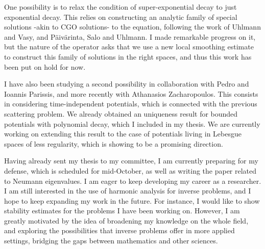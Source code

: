 \documentclass{article}
\begin{document}
One possibility is to relax the condition of super-exponential decay to just exponential decay. This relies on constructing an analytic family of special solutions -akin to CGO solutions- to the equation, following the work of Uhlmann and Vasy, and P\"aiv\"arinta, Salo and Uhlmann. I made remarkable progress on it, but the nature of the operator asks that we use a new local smoothing estimate to construct this family of solutions in the right spaces, and thus this work has been put on hold for now.

I have also been studying a second possibility in collaboration with Pedro and Ioannis Parissis, and more recently with Athanasios Zacharopoulos. This consists in considering time-independent potentials, which is connected with the previous scattering problem. We already obtained an uniqueness result for bounded potentials with polynomial decay, which I included in my thesis. We are currently working on extending this result to the case of potentials living in Lebesgue spaces of less regularity, which is showing to be a promising direction.

Having already sent my thesis to my committee, I am currently preparing for my defense, which is scheduled for mid-October, as well as writing the paper related to Neumann eigenvalues. I am eager to keep developing my career as a researcher. I am still interested in the use of harmonic analysis for inverse problems, and I hope to keep expanding my work in the future. For instance, I would like to show stability estimates for the problems I have been working on. However, I am greatly motivated by the idea of broadening my knowledge on the whole field, and exploring the possibilities that inverse problems offer in more applied settings, bridging the gaps between mathematics and other sciences.
\end{document}
